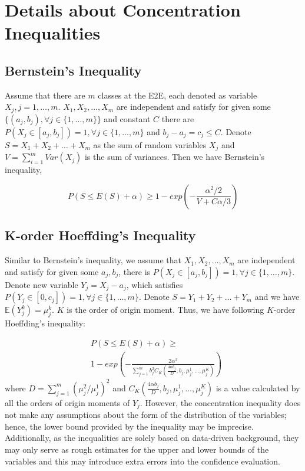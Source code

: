 \documentclass[lettersize,journal]{IEEEtran}
\begin{document}

\section{Details about Concentration Inequalities}
\subsection{Bernstein's Inequality}
Assume that there are $m$ classes at the E2E, each denoted as variable $X_j,j=1,\ldots,m$. 
$X_1,X_2,\ldots,X_m$ are independent and satisfy for given some $\{(a_j,b_j),\forall{j}\in\{1,\ldots,m\} \}$ and constant $C$ there are $P(X_j\in [a_j,b_j])=1, \forall{j}\in\{1,\ldots,m\}$ and $b_j-a_j=c_j\leq C$. 
Denote $S=X_1+X_2+\ldots+X_m$ as the sum of random variables $X_j$ and $V=\sum_{i=1}^{m}Var(X_j)$ is the sum of variances. 
Then we have Bernstein's inequality,

\begin{equation}\label{eqa:Bernstein}
    P(S\leq E(S)+\alpha)\geq 1-exp(-\frac{\alpha^2/2}{V+C\alpha /3})
\end{equation}

\subsection{K-order Hoeffding's Inequality}
Similar to Bernstein's inequality, we assume that $X_1,X_2,\ldots,X_m$ are independent and satisfy for given some $a_j,b_j$, there is $P(X_j\in [a_j,b_j])=1, \forall{j}\in\{1,\ldots,m\}$. 
Denote new variable $Y_j=X_j-a_j$, which satisfies $P(Y_j\in [0,c_j])=1,\forall{j}\in\{1,\ldots,m\}$. 
Denote $S=Y_1+Y_2+\ldots+Y_m$ and we have $\mathbb{E}(Y_j^k)=\mu _j^k$. $K$ is the order of origin moment. 
Thus, we have following $K$-order Hoeffding's inequality:

\begin{equation}\label{eqa:Hoeffding}
\begin{aligned}
    & P(S\leq E(S)+\alpha)\geq \\
    & 1-exp(-\frac{2\alpha^2}{\sum_{j=1}^m b_j^2 C_K(\frac{4\alpha b_j}{D},b_j,\mu_j^1,\ldots,\mu_j^K)})
\end{aligned}
\end{equation}
where $D=\sum_{j=1}^m(\mu_j^2/\mu_j^1)^2$ and $C_K(\frac{4\alpha b_j}{D},b_j,\mu_j^1,\ldots,\mu_j^K)$ is a value calculated by all the orders of origin moments of $Y_j$.
However, the concentration inequality does not make any assumptions about the form of the distribution of the variables; hence, the lower bound provided by the inequality may be imprecise. Additionally, as the inequalities are solely based on data-driven background, they may only serve as rough estimates for the upper and lower bounds of the variables and this may introduce extra errors into the confidence evaluation.
\end{document}
